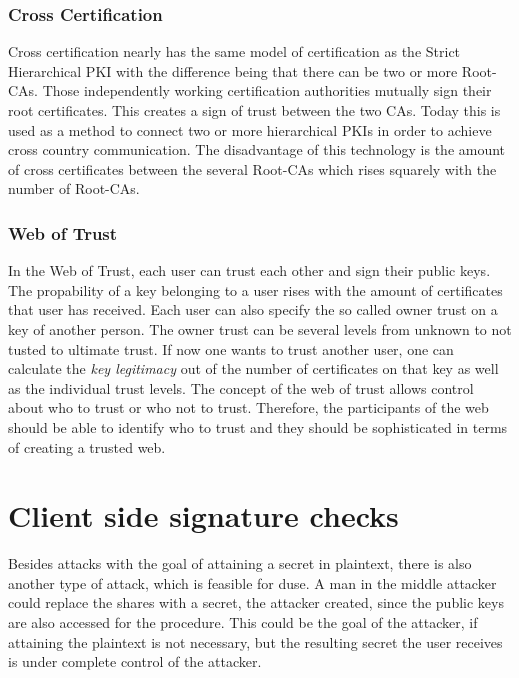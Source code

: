 \subsubsection{Cross Certification}

Cross certification nearly has the same model of certification as the Strict
Hierarchical PKI with the difference being that there can be two or more
Root-CAs. Those independently working certification authorities mutually
sign their root certificates. This creates a sign of trust between the two
CAs. Today this is used as a method to connect two or more hierarchical PKIs
in order to achieve cross country communication. The disadvantage of this
technology is the amount of cross certificates between the several Root-CAs
which rises squarely with the number of Root-CAs.

\subsubsection{Web of Trust}

In the Web of Trust, each user can trust each other and sign their public keys.
The propability of a key belonging to a user rises with the amount of certificates
that user has received. Each user can also specify the so called owner trust on
a key of another person. The owner trust can be several levels from unknown to
not tusted to ultimate trust. If now one wants to trust another user, one can
calculate the \textit{key legitimacy} out of the number of certificates on that
key as well as the individual trust levels. The concept of the web of trust allows
control about who to trust or who not to trust. Therefore, the participants of
the web should be able to identify who to trust and they should be sophisticated
in terms of creating a trusted web.

\section{Client side signature checks}
\label{sec:future:client_sig_check}

Besides attacks with the goal of attaining a secret in plaintext, there is also
another type of attack, which is feasible for duse. A man in the middle
attacker could replace the shares with a secret, the attacker created, since
the public keys are also accessed for the procedure. This could be the goal of
the attacker, if attaining the plaintext is not necessary, but the resulting
secret the user receives is under complete control of the attacker.

